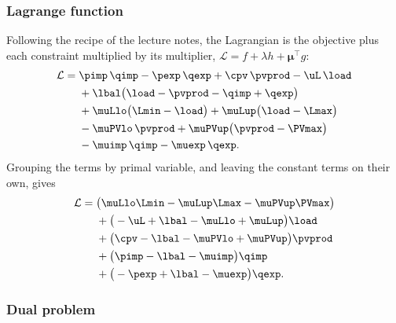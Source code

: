 \subsubsection{Lagrange function}
Following the recipe of the lecture notes, the Lagrangian is the objective plus each
constraint multiplied by its multiplier, $\mathcal{L} = f + \lambda h + \boldsymbol{\mu}^\top
g$:
\begin{align}
    \mathcal{L} = \;
    & \pimp \, \qimp - \pexp \, \qexp + \cpv \, \pvprod - \uL \, \load \nonumber \\
    & + \lbal \big( \load - \pvprod - \qimp + \qexp \big) \nonumber \\
    & + \muLlo \big( \Lmin - \load \big) + \muLup \big( \load - \Lmax \big) \nonumber \\
    & - \muPVlo \, \pvprod + \muPVup \big( \pvprod - \PVmax \big) \nonumber \\
    & - \muimp \, \qimp - \muexp \, \qexp .
    \label{eq:lagrangian}
\end{align}
Grouping the terms by primal variable, and leaving the constant terms on their own, gives
\begin{align}
    \mathcal{L} = \;
    & \big( \muLlo \Lmin - \muLup \Lmax - \muPVup \PVmax \big) \nonumber \\
    & + \big( -\uL + \lbal - \muLlo + \muLup \big) \load \nonumber \\
    & + \big( \cpv - \lbal - \muPVlo + \muPVup \big) \pvprod \nonumber \\
    & + \big( \pimp - \lbal - \muimp \big) \qimp \nonumber \\
    & + \big( -\pexp + \lbal - \muexp \big) \qexp .
    \label{eq:lagrangian_grouped}
\end{align}

\subsubsection{Dual problem}
